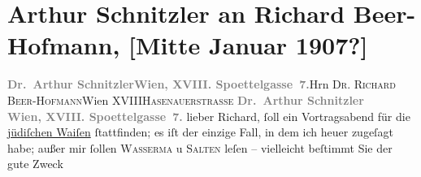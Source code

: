 

         
         \renewcommand{\erwaehntePersonen}{Personen: Richard Beer-Hofmann, Hugo von Hofmannsthal, Felix Salten, Jakob Wassermann}
         \renewcommand{\erwaehnteOrte}{Orte: Edmund-Weiß-Gasse, Hasenauerstraße, Wien, XVIII., Währing}
         \renewcommand{\erwaehnteWerke}{}
               \section[Arthur Schnitzler an Richard Beer-Hofmann, {[}Mitte Januar 1907?{]}]{ Arthur Schnitzler an Richard Beer-Hofmann, {[}Mitte Januar 1907?{]}}\nopagebreak{}\rehead{ }\begin{ledgroupsized}[t]{13cm}\normalsize\beginnumbering \toendnotes[C]{\smallbreak\pagebreak[2]} 
\toendnotes[C]{\smallbreak}\pstart{}{\pb}\textcolor{gray}{\textbf{Dr. Arthur Schnitzler}}\pend{}\pstart{}\textcolor{gray}{\textbf{Wien, XVIII. Spoettelgasse 7.}}\pend{}{\bigskip}\pstart{}{\pb}Hrn \textsc{Dr. Richard
                     Beer-Hofmann}\pend{}\pstart{}Wien XVIII\pend{}\pstart{}\textsc{Hasenauerstraße}\pend{}{\bigskip}\pstart
           \noindent{}{\pb}\textcolor{gray}{\textbf{Dr. Arthur Schnitzler}}{\\}\textcolor{gray}{\textbf{Wien, XVIII. Spoettelgasse 7.}}\pend
           \pstart{}lieber Richard,\pend\pstart
           \label{K_L01652_1v}\label{K_L01652_1h} ſoll ein
               Vortragsabend für die \uline{jüdiſchen Waiſen} ſtattfinden;
               es iſt der einzige Fall, in dem ich heuer zugeſagt habe; außer mir ſollen \textsc{Wasserma{\geminationn}} u \textsc{Salten} leſen – vielleicht beſtimmt {\pb}Sie der gute Zweck

\end{ledgroupsized}
